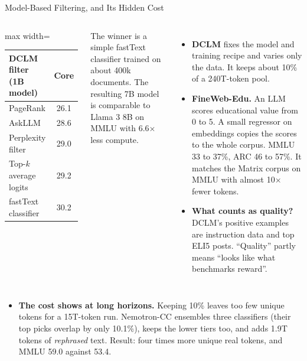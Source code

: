\begin{frame}{Model-Based Filtering, and Its Hidden Cost}
    \begin{columns}[T,onlytextwidth]
        \centering
        \small
        \begin{adjustbox}{max width=\linewidth}\begin{tabular}{lc}
            \toprule
            \textbf{DCLM filter (1B model)} & \textbf{Core} \\
            \midrule
            PageRank & 26.1 \\
            AskLLM & 28.6 \\
            Perplexity filter & 29.0 \\
            Top-$k$ average logits & 29.2 \\
            \rowcolor{KAUSTcyan!12} fastText classifier & 30.2 \\
            \bottomrule
        \end{tabular}\end{adjustbox}

        \vspace{0.5em}
        {\scriptsize The winner is a simple fastText classifier trained on about 400k documents. The resulting 7B model is comparable to Llama 3 8B on MMLU with 6.6$\times$ less compute.}
        \begin{itemize}\small\itemsep0.3em
            \item \textbf{DCLM} fixes the model and training recipe and varies only the data. It keeps about 10\% of a 240T-token pool.
            \item \textbf{FineWeb-Edu.} An LLM scores educational value from 0 to 5. A small regressor on embeddings copies the scores to the whole corpus. MMLU 33 to 37\%, ARC 46 to 57\%. It matches the Matrix corpus on MMLU with almost 10$\times$ fewer tokens.
            \item \textbf{What counts as quality?} DCLM's positive examples are instruction data and top ELI5 posts. ``Quality'' partly means ``looks like what benchmarks reward''.
        \end{itemize}
    \end{columns}
    \begin{itemize}\itemsep0.4em
        \item \textbf{The cost shows at long horizons.} Keeping 10\% leaves too few unique tokens for a 15T-token run. Nemotron-CC ensembles three classifiers (their top picks overlap by only 10.1\%), keeps the lower tiers too, and adds 1.9T tokens of \emph{rephrased} text. Result: four times more unique real tokens, and MMLU 59.0 against 53.4.
    \end{itemize}
\end{frame}

